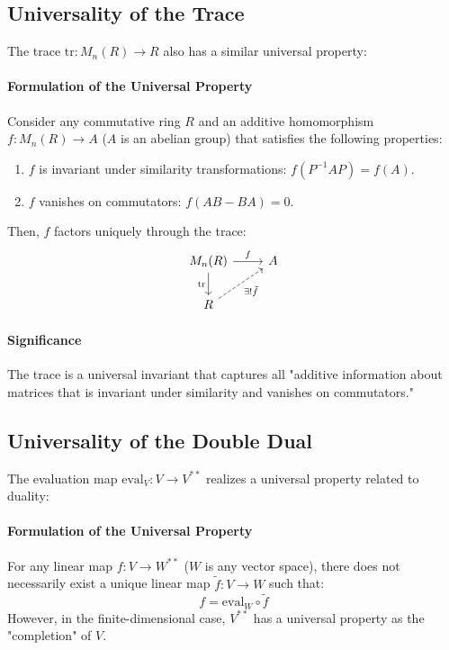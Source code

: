 \documentclass[uplatex,a4j,12pt,dvipdfmx]{jsarticle}
\begin{document}
\subsection{Universality of the Trace}

The trace $\text{tr}: M_n(R) \to R$ also has a similar universal property:

\paragraph{Formulation of the Universal Property}
Consider any commutative ring $R$ and an additive homomorphism $f: M_n(R) \to A$ ($A$ is an abelian group) that satisfies the following properties:
\begin{enumerate}
	\item $f$ is invariant under similarity transformations: $f(P^{-1}AP) = f(A)$.
	\item $f$ vanishes on commutators: $f(AB - BA) = 0$.
\end{enumerate}

Then, $f$ factors uniquely through the trace:
\[
	\begin{tikzcd}
		M_n(R) \arrow[r, "f"] \arrow[d, "\text{tr}"'] & A \\
		R \arrow[ru, dashed, "\exists! \tilde{f}"'] &
	\end{tikzcd}
\]

\paragraph{Significance}
The trace is a universal invariant that captures all "additive information about matrices that is invariant under similarity and vanishes on commutators."

\subsection{Universality of the Double Dual}

The evaluation map $\mathrm{eval}_V: V \to V^{**}$ realizes a universal property related to duality:

\paragraph{Formulation of the Universal Property}
For any linear map $f: V \to W^{**}$ ($W$ is any vector space), there does not necessarily exist a unique linear map $\tilde{f}: V \to W$ such that:
\[
	f = \mathrm{eval}_W \circ \tilde{f}
\]
However, in the finite-dimensional case, $V^{**}$ has a universal property as the "completion" of $V$.
\end{document}
